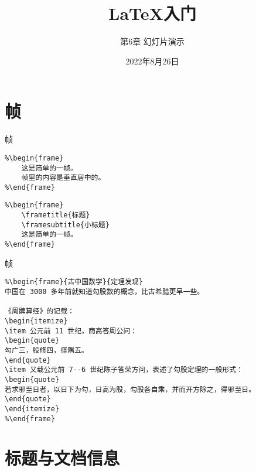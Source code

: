 \documentclass[11pt]{beamer}
\begin{document}
	\title{\LaTeX 入门}
	\subtitle{第6章 幻灯片演示}
	\date{2022年8月26日}
	\begin{frame}[plain]
		\maketitle
	\end{frame}

\section{帧}

\begin{frame}[fragile]{帧}
\begin{lstlisting}
%\begin{frame}
	这是简单的一帧。
	帧里的内容是垂直居中的。
%\end{frame}
\end{lstlisting}
\begin{lstlisting}
%\begin{frame}
	\frametitle{标题}
	\framesubtitle{小标题}
	这是简单的一帧。
%\end{frame}
\end{lstlisting}
\end{frame}

\begin{frame}[fragile]{帧}
\begin{lstlisting}
%\begin{frame}{古中国数学}{定理发现}
中国在 3000 多年前就知道勾股数的概念，比古希腊更早一些。

《周髀算经》的记载：
\begin{itemize}
\item 公元前 11 世纪，商高答周公问：
\begin{quote}
勾广三，股修四，径隅五。
\end{quote}
\item 又载公元前 7--6 世纪陈子答荣方问，表述了勾股定理的一般形式：
\begin{quote}
若求邪至日者，以日下为勾，日高为股，勾股各自乘，并而开方除之，得邪至日。
\end{quote}
\end{itemize}
%\end{frame}
\end{lstlisting}
\end{frame}

\section{标题与文档信息}
\end{document}
